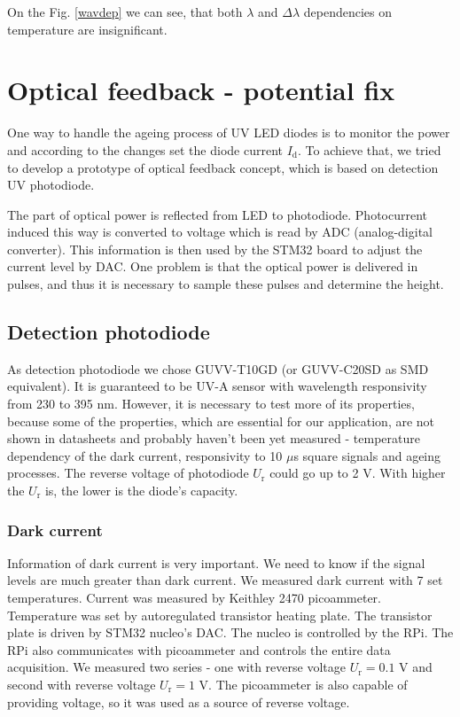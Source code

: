 On the Fig. \ref{wavdep} we can see, that both $\lambda$ and $\Delta \lambda$ dependencies on temperature are insignificant.

\section{Optical feedback - potential fix}
One way to handle the ageing process of UV LED diodes is to monitor the power and according to the changes set the diode current $I_\textrm{d}$. To achieve that, we tried to develop a prototype of optical feedback concept, which is based on detection UV photodiode. 
\par
The part of optical power is reflected from LED to photodiode. Photocurrent induced this way is converted to voltage which is read by ADC (analog-digital converter). This information is then used by the STM32 board to adjust the current level by DAC. One problem is that the optical power is delivered in pulses, and thus it is necessary to sample these pulses and determine the height.
\par
\subsection{Detection photodiode}
As detection photodiode we chose GUVV-T10GD (or GUVV-C20SD as SMD equivalent). It is guaranteed to be UV-A sensor with wavelength responsivity from 230 to 395 nm. However, it is necessary to test more of its properties, because some of the properties, which are essential for our application, are not shown in datasheets and probably haven't been yet measured - temperature dependency of the dark current, responsivity to 10 $\mu$s square signals and ageing processes. The reverse voltage of photodiode $U_\textrm{r}$ could go up to 2 V. With higher the $U_\textrm{r}$ is, the lower is the diode's capacity.
\par
\subsubsection{Dark current}
Information of dark current is very important. We need to know if the signal levels are much greater than dark current. We measured dark current with 7 set temperatures. Current was measured by Keithley 2470 picoammeter. Temperature was set by autoregulated transistor heating plate. The transistor plate is driven by STM32 nucleo's DAC. The nucleo is controlled by the RPi. The RPi also communicates with picoammeter and controls the entire data acquisition. We measured two series - one with reverse voltage $U_\textrm{r} = 0.1$ V and second with reverse voltage $U_\textrm{r} = 1$ V. The picoammeter is also capable of providing voltage, so it was used as a source of reverse voltage.

